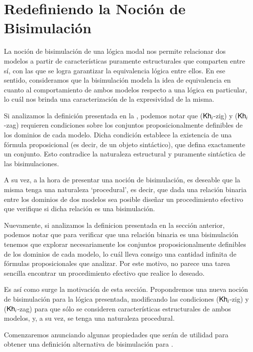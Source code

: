\chapter{Redefiniendo la Noción de Bisimulación}

La noción de bisimulación de una lógica modal nos permite relacionar dos modelos a partir de características puramente estructurales 
que comparten entre sí, con las que se logra garantizar la equivalencia lógica entre ellos. En ese sentido, consideramos que la 
bisimulación modela la idea de equivalencia en cuanto al comportamiento de ambos modelos respecto a una lógica en particular, lo cuál nos brinda
una caracterización de la expresividad de la misma.

Si analizamos la definición presentada en la , podemos notar que ($\mathsf{Kh}_i$-zig) y ($\mathsf{Kh}_i$-zag) requieren condiciones 
sobre los conjuntos proposicionalmente definibles de los dominios de cada modelo. Dicha condición establece la existencia de una fórmula proposicional
(es decir, de un objeto sintáctico), que defina exactamente un conjunto. Esto contradice la naturaleza estructural y puramente sintáctica 
de las bisimulaciones. 

A su vez, a la hora de presentar una noción de bisimulación, es deseable que la misma tenga una naturaleza `procedural', es decir,
que dada una relación binaria entre los dominios de dos modelos sea posible diseñar un procedimiento efectivo que verifique si dicha relación 
es una bisimulación.

Nuevamente, si analizamos la definicion presentada en la sección anterior, podemos notar que para verificar que una relación binaria es una bisimulación
tenemos que explorar necesariamente los conjuntos proposicionalmente definibles de los dominios de cada modelo, lo cuál lleva consigo una cantidad 
infinita de fórmulas proposicionales que analizar. Por este motivo, no parece una tarea sencilla encontrar un procedimiento efectivo que realice lo deseado.

Es así como surge la motivación de esta sección. Propondremos una nueva noción de bisimulación para la lógica presentada, modificando las condiciones
($\mathsf{Kh}_i$-zig) y ($\mathsf{Kh}_i$-zag) para que sólo se consideren características estructurales de ambos modelos, y, a su vez, se tenga una naturaleza procedural.

Comenzaremos anunciando algunas propiedades que serán de utilidad para obtener una definición alternativa de bisimulación para \KHilogic.

